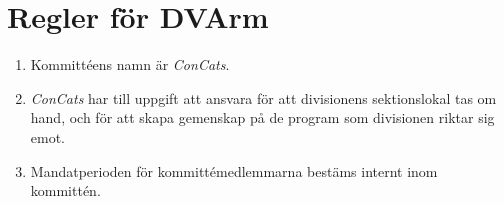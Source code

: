 \documentclass{dvd}
\begin{document}
\section{Regler för DVArm}

	\begin{enumerate}[label=\arabic* §, ref=\arabic*]
		\item Kommittéens namn är \emph{ConCats}.

		\item \emph{ConCats} har till uppgift att ansvara för att divisionens sektionslokal tas om hand, och för att skapa gemenskap på de program som divisionen riktar sig emot.

		\item Mandatperioden för kommittémedlemmarna bestäms internt inom kommittén.

	\end{enumerate}
\end{document}
